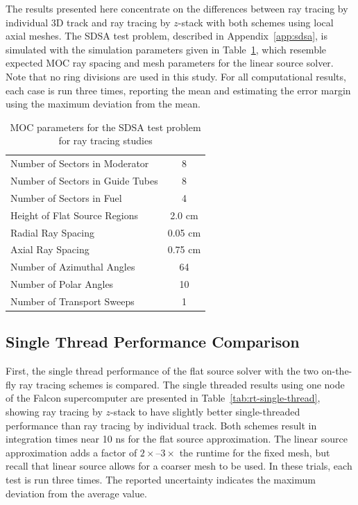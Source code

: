 The results presented here concentrate on the differences between ray tracing by individual 3D track and ray tracing by $z$-stack with both schemes using local axial meshes. The SDSA test problem, described in Appendix~\ref{app:sdsa}, is simulated with the simulation parameters given in Table~\ref{tab:sdsa-rt-flat}, which resemble expected \ac{MOC} ray spacing and mesh parameters for the linear source solver. Note that no ring divisions are used in this study. For all computational results, each case is run three times, reporting the mean and estimating the error margin using the maximum deviation from the mean.
	
\begin{table}[ht]
	\centering
	\caption{MOC parameters for the SDSA test problem for ray tracing studies}
	\medskip
	\begin{tabular}{lc}
		\hline
		Number of Sectors in Moderator & 8 \\
		Number of Sectors in Guide Tubes & 8 \\
		Number of Sectors in Fuel & 4 \\
		Height of Flat Source Regions & 2.0 cm \\
		Radial Ray Spacing & 0.05 cm \\
		Axial Ray Spacing & 0.75 cm \\
		Number of Azimuthal Angles & 64 \\
		Number of Polar Angles & 10 \\
		Number of Transport Sweeps & 1 \\
		\hline
	\end{tabular}
	\label{tab:sdsa-rt-flat}
\end{table}

\subsection{Single Thread Performance Comparison}

First, the single thread performance of the flat source solver with the two on-the-fly ray tracing schemes is compared. The single threaded results using one node of the Falcon supercomputer are presented in Table~\ref{tab:rt-single-thread}, showing ray tracing by $z$-stack to have slightly better single-threaded performance than ray tracing by individual track. Both schemes result in integration times near 10 ns for the flat source approximation. The linear source approximation adds a factor of $2\times$--$3\times$ the runtime for the fixed mesh, but recall that linear source allows for a coarser mesh to be used. In these trials, each test is run three times. The reported uncertainty indicates the maximum deviation from the average value.

